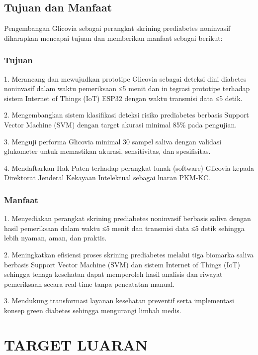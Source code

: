 \documentclass[a4paper,12pt]{article}
\begin{document}
\subsection{Tujuan dan Manfaat}

Pengembangan Glicovia sebagai perangkat skrining prediabetes noninvasif diharapkan mencapai tujuan dan memberikan manfaat sebagai berikut:

\subsubsection{Tujuan}

1.  Merancang dan mewujudkan prototipe Glicovia sebagai deteksi dini diabetes noninvasif dalam waktu pemeriksaan ≤5 menit dan in tegrasi prototipe terhadap sistem Internet of Things (IoT) ESP32 dengan waktu transmisi data ≤5 detik.

2.  Mengembangkan sistem klasifikasi deteksi risiko prediabetes berbasis Support Vector Machine (SVM) dengan target akurasi minimal 85\% pada pengujian.

3.  Menguji performa Glicovia minimal 30 sampel saliva dengan validasi glukometer untuk memastikan akurasi, sensitivitas, dan spesifisitas.

4.  Mendaftarkan Hak Paten terhadap perangkat lunak (software) Glicovia kepada Direktorat Jenderal Kekayaan Intelektual sebagai luaran PKM-KC.

\subsubsection{Manfaat}

1.  Menyediakan perangkat skrining prediabetes noninvasif berbasis saliva dengan hasil pemeriksaan dalam waktu ≤5 menit dan transmisi data ≤5 detik sehingga lebih nyaman, aman, dan praktis.

2.  Meningkatkan efisiensi proses skrining prediabetes melalui tiga biomarka saliva berbasis Support Vector Machine (SVM) dan sistem Internet of Things (IoT) sehingga tenaga kesehatan dapat memperoleh hasil analisis dan riwayat pemeriksaan secara real-time tanpa pencatatan manual.

3.  Mendukung transformasi layanan kesehatan preventif serta implementasi konsep green diabetes sehingga mengurangi limbah medis.

\section{TARGET LUARAN}
\end{document}
